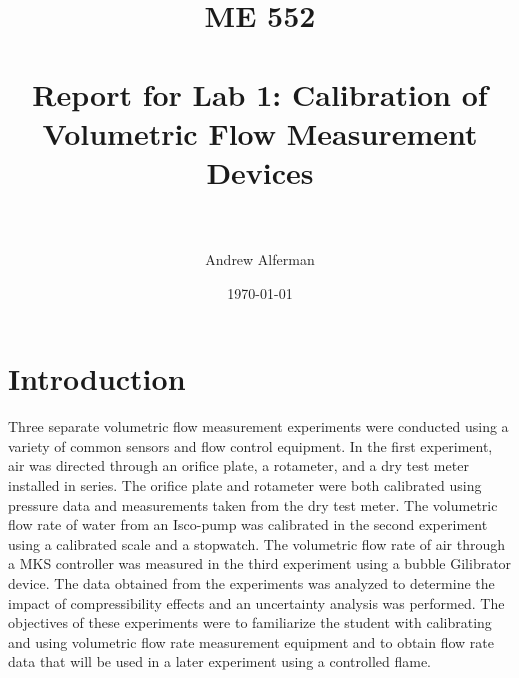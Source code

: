 \documentclass[paper=letter, fontsize=10pt]{scrartcl} %
\title{	
\normalfont \normalsize 
\textsc{ME 552} \\ [25pt] %
\horrule{0.5pt} \\[0.4cm] %
\huge Report for Lab 1: Calibration of Volumetric Flow Measurement Devices \\ %
\horrule{2pt} \\[0.5cm] %
}
\author{Andrew Alferman} %
\date{\normalsize\today} %
\begin{document}
\iffalse
To include in report:

Part 1: 	Plots of the calibration for both the orifice plates and the rotameters.

Part 2:	The value reported by the Isco-pumps as the independent variable and the calibrated flow rate as the dependent variable.

Part 3:	Plot data for MKS inputs to actual flow rates determined by Gilibrator.  Be sure to show uncertainty bars (design state uncertainty on the measured and dependent variables.


Questions to answer:

Part 1:	1) How does the discharge coefficient compare to that reported for the orifice plate?  Is the discharge coefficient constant for compressible and incompressible flow?
		2) Are compressibility effects a concern for the rotameter over the range that you studied? Justify your answer.

Part 2:	1) Are the values reported by the Isco-pumps appropriate to use, or does a calibration need to be applied to the values reported for the Isco-pumps.  Consider if values fall within the uncertainty bounds.

Part 3:	1) Discuss why the calibrated and MKS reported values are linearly related or not

\fi

\maketitle %

\section{Introduction}
\label{intro}
Three separate volumetric flow measurement experiments were conducted using a variety of common sensors and flow control equipment.  In the first experiment, air was directed through an orifice plate, a rotameter, and a dry test meter installed in series.  The orifice plate and rotameter were both calibrated using pressure data and measurements taken from the dry test meter.  The volumetric flow rate of water from an Isco-pump was calibrated in the second experiment using a calibrated scale and a stopwatch.  The volumetric flow rate of air through a MKS controller was measured in the third experiment using a bubble Gilibrator device.  The data obtained from the experiments was analyzed to determine the impact of compressibility effects and an uncertainty analysis was performed.  The objectives of these experiments were to familiarize the student with calibrating and using volumetric flow rate measurement equipment and to obtain flow rate data that will be used in a later experiment using a controlled flame.
\end{document}
